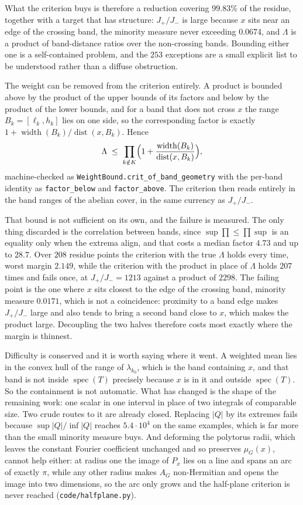 \documentclass[11pt]{article}
\theoremstyle{remark}
\begin{document}
What the criterion buys is therefore a reduction covering $99.83\%$ of the residue, together
with a target that has structure: $J_+/J_-$ is large because $x$ sits near an edge of the
crossing band, the minority measure never exceeding $0.0674$, and $\Lambda$ is a product of
band-distance ratios over the non-crossing bands. Bounding either one is a self-contained
problem, and the $253$ exceptions are a small explicit list to be understood rather than a
diffuse obstruction.

The weight can be removed from the criterion entirely. A product is bounded above by the
product of the upper bounds of its factors and below by the product of the lower bounds, and
for a band that does not cross $x$ the range $B_k=[\ell_k,h_k]$ lies on one side, so the
corresponding factor is exactly $1+\operatorname{width}(B_k)/\operatorname{dist}(x,B_k)$.
Hence
\[
   \Lambda\;\le\;\prod_{k\notin K}\Bigl(1+\frac{\operatorname{width}(B_k)}
   {\operatorname{dist}(x,B_k)}\Bigr),
\]
machine-checked as \texttt{WeightBound.crit\_of\_band\_geometry} with the per-band identity as
\texttt{factor\_below} and \texttt{factor\_above}. The criterion then reads entirely in the
band ranges of the abelian cover, in the same currency as $J_+/J_-$.

That bound is not sufficient on its own, and the failure is measured. The only thing discarded
is the correlation between bands, since $\sup\prod\le\prod\sup$ is an equality only when the
extrema align, and that costs a median factor $4.73$ and up to $28.7$. Over $208$ residue
points the criterion with the true $\Lambda$ holds every time, worst margin $2.149$, while the
criterion with the product in place of $\Lambda$ holds $207$ times and fails once, at
$J_+/J_-=1213$ against a product of $2298$. The failing point is the one where $x$ sits
closest to the edge of the crossing band, minority measure $0.0171$, which is not a
coincidence: proximity to a band edge makes $J_+/J_-$ large and also tends to bring a second
band close to $x$, which makes the product large. Decoupling the two halves therefore costs
most exactly where the margin is thinnest.

Difficulty is conserved and it is worth saying where it went. A weighted mean lies in the
convex hull of the range of $\lambda_{k_0}$, which is the band containing $x$, and that band
is not inside $\operatorname{spec}(T)$ precisely because $x$ is in it and outside
$\operatorname{spec}(T)$. So the containment is not automatic. What has changed is the shape
of the remaining work: one scalar in one interval in place of two integrals of comparable
size. Two crude routes to it are already closed. Replacing $|Q|$ by its extremes fails
because $\sup|Q|/\inf|Q|$ reaches $5.4\cdot10^{4}$ on the same examples, which is far more
than the small minority measure buys. And deforming the polytorus radii, which leaves the
constant Fourier coefficient unchanged and so preserves $\mu_G(x)$, cannot help either: at
radius one the image of $P_x$ lies on a line and spans an arc of exactly $\pi$, while any
other radius makes $A_G$ non-Hermitian and opens the image into two dimensions, so the arc
only grows and the half-plane criterion is never reached (\texttt{code/halfplane.py}).
\end{document}
